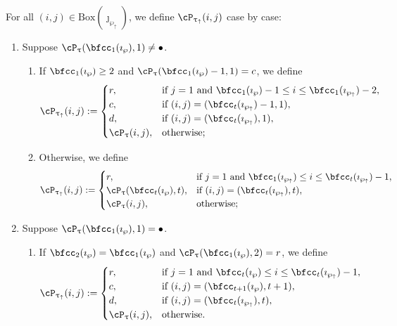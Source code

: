 \documentclass[12pt,a4paper]{amsart}
\def\wpu{\wp_{\uparrow}}
\def\wpd{\wp} %
\def\uptauu{\uptau_{\uparrow}}
\def\uptaud{\uptau} %
\numberwithin{equation}{section}
\theoremstyle{remark}
\newcommand{\BOX}[1]{\mathrm{Box}(#1)}
\begin{document}
  For all $(i,j)\in \BOX{\jmath_{\wpu}}$, we define $\cP_{\uptauu}(i,j)$ case by
  case:
 \begin{enumerate}[label=(\alph*)]
   \item Suppose
   $\cP_{\uptaud}(\bfcc_{1}(\imath_{\wpd}),1)\neq \bullet$.
   \begin{enumerate}[label={\localtextbulletone}]
     \item If $\bfcc_{1}(\imath_{\wpd})\geq 2$ and
     $\cP_{\uptau}(\bfcc_{1}(\imath_{\wpd})-1,1) = c$,
     we define
     \[
       \cP_{\uptauu}(i,j) := \begin{cases}
         r ,& \text{if $j=1$ and $\bfcc_{1}(\imath_{\wpd})-1
           \leq i \leq \bfcc_{1}(\imath_{\wpu})-2$},\\
         c ,& \text{if $(i,j)=(\bfcc_{t}(\imath_{\wpu})-1,1)$},\\
         d ,& \text{if $(i,j)=(\bfcc_{t}(\imath_{\wpu}),1)$},\\
         \cP_{\uptaud}(i,j) ,&\text{otherwise};
       \end{cases}
     \]
     \item Otherwise, we define
     \[
       \cP_{\uptauu}(i,j) := \begin{cases}
         r ,& \text{if $j=1$ and $\bfcc_{1}(\imath_{\wpu})
           \leq i \leq \bfcc_{t}(\imath_{\wpu})-1$},\\
         \cP_{\uptaud}(\bfcc_{t}(\imath_{\wpd}),t) ,&
         \text{if $(i,j)=(\bfcc_{t}(\imath_{\wpu}),t)$},\\
         \cP_{\uptaud}(i,j) ,&\text{otherwise};
       \end{cases}
     \]
   \end{enumerate}
   \item Suppose $\cP_{\uptaud}(\bfcc_{1}(\imath_{\wpd}),1)=\bullet$.
   \begin{enumerate}[label={\localtextbulletone}]
     \item If $\bfcc_{2}(\imath_{\wpd}) = \bfcc_{1}(\imath_{\wpd})$
     and
     $\cP_{\uptaud}(\bfcc_{1}(\imath_{\wpd}),2) = r$,
     we define
     \[
       \cP_{\uptauu}(i,j) := \begin{cases}
         r ,& \text{if $j=1$ and $\bfcc_{t}(\imath_{\wpd})\leq i \leq \bfcc_{t}(\imath_{\wpu})-1$},\\
         c ,& \text{if $(i,j)=(\bfcc_{t+1}(\imath_{\wpd}),t+1)$},\\
         d ,& \text{if $(i,j)=(\bfcc_{t}(\imath_{\wpu}),t)$},\\
         \cP_{\uptaud}(i,j) ,&\text{otherwise}.

\end{cases}\]
\end{enumerate}
\end{enumerate}
\end{document}

